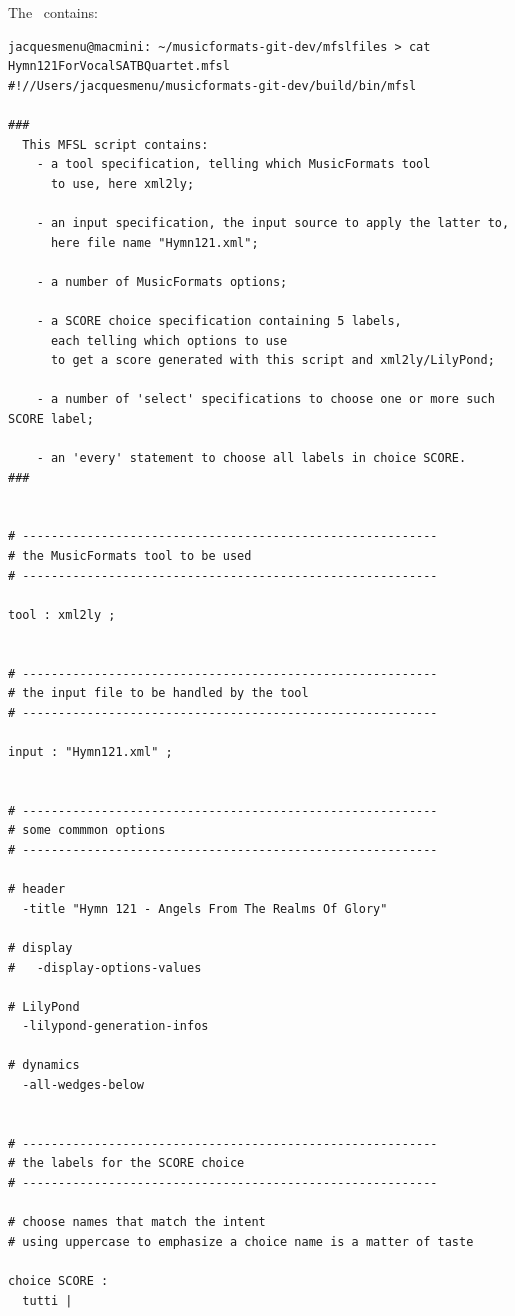 The  \script\ contains:
\begin{lstlisting}[language=MFSL]
jacquesmenu@macmini: ~/musicformats-git-dev/mfslfiles > cat Hymn121ForVocalSATBQuartet.mfsl
#!//Users/jacquesmenu/musicformats-git-dev/build/bin/mfsl

###
  This MFSL script contains:
    - a tool specification, telling which MusicFormats tool
      to use, here xml2ly;

    - an input specification, the input source to apply the latter to,
      here file name "Hymn121.xml";

    - a number of MusicFormats options;

    - a SCORE choice specification containing 5 labels,
      each telling which options to use
      to get a score generated with this script and xml2ly/LilyPond;

    - a number of 'select' specifications to choose one or more such SCORE label;

    - an 'every' statement to choose all labels in choice SCORE.
###


# ----------------------------------------------------------
# the MusicFormats tool to be used
# ----------------------------------------------------------

tool : xml2ly ;


# ----------------------------------------------------------
# the input file to be handled by the tool
# ----------------------------------------------------------

input : "Hymn121.xml" ;


# ----------------------------------------------------------
# some commmon options
# ----------------------------------------------------------

# header
  -title "Hymn 121 - Angels From The Realms Of Glory"

# display
#   -display-options-values

# LilyPond
  -lilypond-generation-infos

# dynamics
  -all-wedges-below


# ----------------------------------------------------------
# the labels for the SCORE choice
# ----------------------------------------------------------

# choose names that match the intent
# using uppercase to emphasize a choice name is a matter of taste

choice SCORE :
  tutti |


\end{lstlisting}
